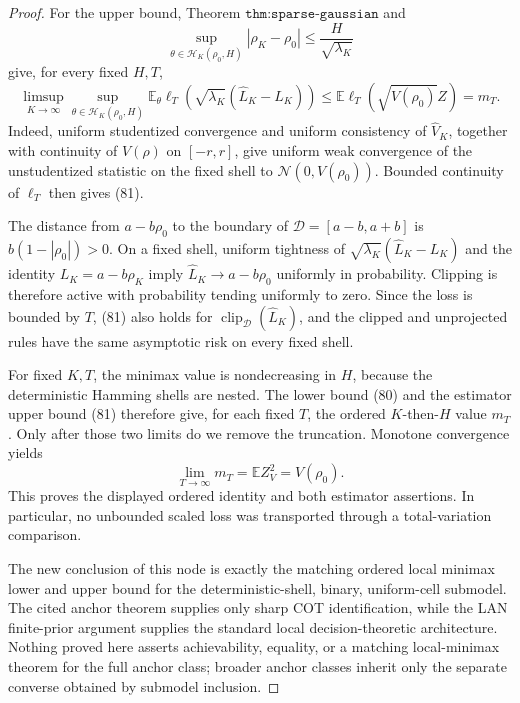 \documentclass{article}
\begin{document}
\begin{proof}
For the upper bound, Theorem \(\texttt{thm:sparse-gaussian}\) and
\[
 \sup_{\theta\in\mathcal H_K(\rho_0,H)}
 |\rho_K-\rho_0|\le\frac H{\sqrt{\lambda_K}}
\]
give, for every fixed \(H,T\),
\[
 \limsup_{K\to\infty}
 \sup_{\theta\in\mathcal H_K(\rho_0,H)}
 \mathbb E_\theta\ell_T\!\left(
 \sqrt{\lambda_K}(\widehat L_K-L_K)\right)
 \le
 \mathbb E\ell_T(\sqrt{V(\rho_0)}Z)
 =m_T.
 \tag{81}
\]
Indeed, uniform studentized convergence and uniform consistency of
\(\widehat V_K\), together with continuity of \(V(\rho)\) on
\([-r,r]\), give uniform weak convergence of the unstudentized statistic
on the fixed shell to \(\mathcal N(0,V(\rho_0))\).  Bounded continuity
of \(\ell_T\) then gives (81).

The distance from \(a-b\rho_0\) to the boundary of
\(\mathcal D=[a-b,a+b]\) is \(b(1-|\rho_0|)>0\).  On a fixed shell,
uniform tightness of \(\sqrt{\lambda_K}(\widehat L_K-L_K)\) and the
identity \(L_K=a-b\rho_K\) imply
\(\widehat L_K\to a-b\rho_0\) uniformly in probability.  Clipping is
therefore active with probability tending uniformly to zero.  Since the
loss is bounded by \(T\), (81) also holds for
\(\operatorname{clip}_{\mathcal D}(\widehat L_K)\), and the clipped and
unprojected rules have the same asymptotic risk on every fixed shell.

For fixed \(K,T\), the minimax value is nondecreasing in \(H\), because
the deterministic Hamming shells are nested.  The lower bound (80) and
the estimator upper bound (81) therefore give, for each fixed \(T\),
the ordered \(K\)-then-\(H\) value \(m_T\).  Only after those two limits
do we remove the truncation.  Monotone convergence yields
\[
 \lim_{T\to\infty}m_T
 =\mathbb EZ_V^2
 =V(\rho_0).
 \tag{82}
\]
This proves the displayed ordered identity and both estimator
assertions.  In particular, no unbounded scaled loss was transported
through a total-variation comparison.

The new conclusion of this node is exactly the matching ordered local
minimax lower and upper bound for the deterministic-shell, binary,
uniform-cell submodel.  The cited anchor theorem supplies only sharp COT
identification, while the LAN finite-prior argument supplies the
standard local decision-theoretic architecture.  Nothing proved here
asserts achievability, equality, or a matching local-minimax theorem for
the full anchor class; broader anchor classes inherit only the separate
converse obtained by submodel inclusion.
\end{proof}
\end{document}
